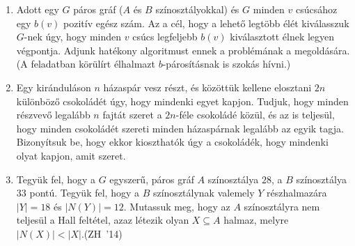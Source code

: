 \documentclass[a4paper, 12pt]{article}
\begin{document}
\begin{enumerate}
\item Adott egy $G$ páros gráf ($A$ és $B$ színosztályokkal) és $G$ minden $v$ csúcsához egy $b(v)$ pozitív egész szám. Az a cél, hogy a lehető legtöbb élét kiválasszuk $G$-nek úgy, hogy minden $v$ csúcs legfeljebb $b(v)$ kiválasztott élnek legyen végpontja. Adjunk hatékony algoritmust ennek a problémának a megoldására. (A feladatban körülírt élhalmazt $b$-párosításnak is szokás hívni.)




\item Egy kiránduláson $n$ házaspár vesz részt, és közöttük kellene elosztani $2n$ különböző csokoládét úgy, hogy mindenki egyet kapjon. Tudjuk, hogy minden részvevő legalább $n$ fajtát szeret a $2n$-féle csokoládé közül, és az is teljesül, hogy minden csokoládét szereti minden házaspárnak legalább az egyik tagja. Bizonyítsuk be, hogy ekkor kioszthatók úgy a csokoládék, hogy mindenki olyat kapjon, amit szeret. %


\item Tegyük fel, hogy a $G$ egyszerű, páros gráf $A$ színosztálya $28$, a $B$ színosztálya $33$ pontú. Tegyük fel, hogy a $B$ színosztálynak valemely $Y$ részhalmazára $|Y|=18$ és $|N(Y)|=12$. Mutassuk meg, hogy az $A$ színosztályra nem teljesül a Hall feltétel, azaz létezik olyan $X\subseteq A$ halmaz, melyre $|N(X)|<|X|$.\hfill(ZH~'14)


\end{enumerate}
\end{document}
